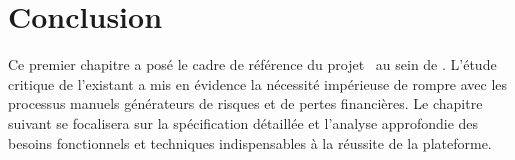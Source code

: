 \section{Conclusion}

Ce premier chapitre a posé le cadre de référence du projet \projectShortTitle\ au sein de \hostCompany. L'étude critique de l'existant a mis en évidence la nécessité impérieuse de rompre avec les processus manuels générateurs de risques et de pertes financières. Le chapitre suivant se focalisera sur la spécification détaillée et l'analyse approfondie des besoins fonctionnels et techniques indispensables à la réussite de la plateforme.
